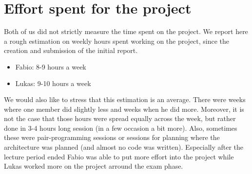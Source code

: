 \documentclass[a4paper,english,10pt,NET]{tumarticle}
\begin{document}
\section{Effort spent for the project}
Both of us did not strictly measure the time spent on the project. We report here a rough estimation on weekly hours spent working on the project, since the creation and submission of the initial report.

\begin{itemize}
	\item Fabio: 8-9 hours a week
	\item Lukas: 9-10 hours a week
\end{itemize}

We would also like to stress that this estimation is an average.
There were weeks where one member did slightly less and weeks when he did more.
Moreover, it is not the case that those hours were spread equally across the week, but rather done in 3-4 hours long session (in a few occasion a bit more).
Also, sometimes these were pair-programming sessions or sessions for planning where the architecture was planned (and almost no code was written).
Especially after the lecture period ended Fabio was able to put more effort into the project while Lukas worked more on the project arround the exam phase.

\todos
\end{document}

